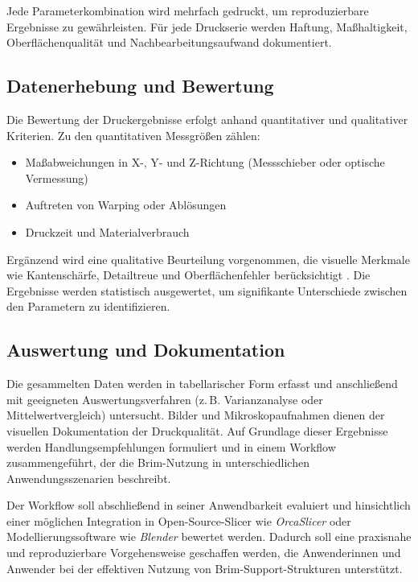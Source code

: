 Jede Parameterkombination wird mehrfach gedruckt, um reproduzierbare Ergebnisse zu gewährleisten. Für jede Druckserie werden Haftung, Maßhaltigkeit, Oberflächenqualität und Nachbearbeitungsaufwand dokumentiert.  

\subsection{Datenerhebung und Bewertung}

Die Bewertung der Druckergebnisse erfolgt anhand quantitativer und qualitativer Kriterien.  
Zu den quantitativen Messgrößen zählen:
\begin{itemize}
  \item Maßabweichungen in X-, Y- und Z-Richtung (Messschieber oder optische Vermessung)
  \item Auftreten von Warping oder Ablösungen
  \item Druckzeit und Materialverbrauch
\end{itemize}

Ergänzend wird eine qualitative Beurteilung vorgenommen, die visuelle Merkmale wie Kantenschärfe, Detailtreue und Oberflächenfehler berücksichtigt \cite{FFFPolymerReview}. Die Ergebnisse werden statistisch ausgewertet, um signifikante Unterschiede zwischen den Parametern zu identifizieren.  

\subsection{Auswertung und Dokumentation}

Die gesammelten Daten werden in tabellarischer Form erfasst und anschließend mit geeigneten Auswertungsverfahren (z.\,B. Varianzanalyse oder Mittelwertvergleich) untersucht.  
Bilder und Mikroskopaufnahmen dienen der visuellen Dokumentation der Druckqualität. Auf Grundlage dieser Ergebnisse werden Handlungsempfehlungen formuliert und in einem Workflow zusammengeführt, der die Brim-Nutzung in unterschiedlichen Anwendungsszenarien beschreibt.  

Der Workflow soll abschließend in seiner Anwendbarkeit evaluiert und hinsichtlich einer möglichen Integration in Open-Source-Slicer wie \textit{OrcaSlicer} oder Modellierungssoftware wie \textit{Blender} bewertet werden. Dadurch soll eine praxisnahe und reproduzierbare Vorgehensweise geschaffen werden, die Anwenderinnen und Anwender bei der effektiven Nutzung von Brim-Support-Strukturen unterstützt.
